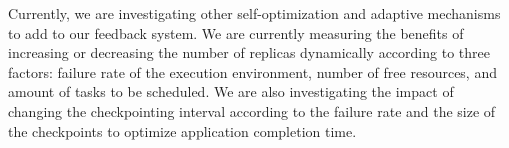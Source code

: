\documentclass{cpeauth}
\begin{document}
Currently, we are investigating other self-optimization and adaptive mechanisms
to add to our feedback system. We are currently measuring the benefits of increasing
or decreasing the number of replicas dynamically according to three factors: failure rate
of the execution environment, number of free resources, and amount of tasks to
be scheduled. We are also investigating the impact of changing the
checkpointing interval according to the failure rate and the size of the
checkpoints to optimize application completion time. 


%
%
%
%
%
%
%
%
%
%
%
%
%
%
%
\end{document}
